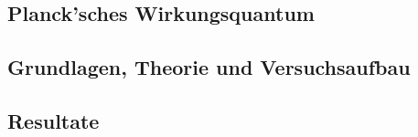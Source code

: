 \documentclass[12pt,a4paper]{article}
\begin{document}
\begin{multicols}{2}




%			



\section{Planck'sches Wirkungsquantum}

\subsection{Grundlagen, Theorie und Versuchsaufbau}


\subsection{Resultate}


\end{multicols}
\end{document}
